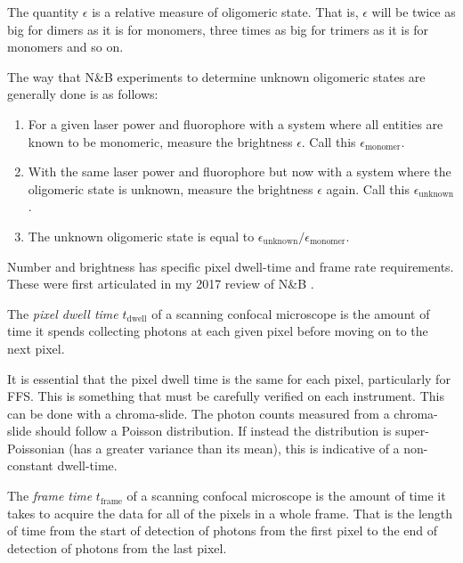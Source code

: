 \documentclass[12pt,]{book}
\providecommand{\tightlist}{%
  \setlength{\itemsep}{0pt}\setlength{\parskip}{0pt}}
\theoremstyle{definition}
\theoremstyle{definition}
\theoremstyle{definition}
\theoremstyle{remark}
\let\BeginKnitrBlock\begin \let\EndKnitrBlock\end
\begin{document}
The quantity \(\epsilon\) is a relative measure of oligomeric state.
That is, \(\epsilon\) will be twice as big for dimers as it is for
monomers, three times as big for trimers as it is for monomers and so
on.

The way that N\&B experiments to determine unknown oligomeric states are
generally done is as follows:

\begin{enumerate}
\def\labelenumi{\arabic{enumi}.}
\tightlist
\item
  For a given laser power and fluorophore with a system where all
  entities are known to be monomeric, measure the brightness
  \(\epsilon\). Call this \(\epsilon_\text{monomer}\).
\item
  With the same laser power and fluorophore but now with a system where
  the oligomeric state is unknown, measure the brightness \(\epsilon\)
  again. Call this \(\epsilon_\text{unknown}\).
\item
  The unknown oligomeric state is equal to
  \(\epsilon_\text{unknown} / \epsilon_\text{monomer}\).
\end{enumerate}

Number and brightness has specific pixel dwell-time and frame rate
requirements. These were first articulated in my 2017 review of N\&B
\citep{NBreview}.

\BeginKnitrBlock{definition}
\protect\hypertarget{def:unnamed-chunk-15}{}{\label{def:unnamed-chunk-15}
}The \emph{pixel dwell time} \(t_\text{dwell}\) of a scanning confocal
microscope is the amount of time it spends collecting photons at each
given pixel before moving on to the next pixel.
\EndKnitrBlock{definition}

It is essential that the pixel dwell time is the same for each pixel,
particularly for FFS. This is something that must be carefully verified
on each instrument. This can be done with a chroma-slide. The photon
counts measured from a chroma-slide should follow a Poisson
distribution. If instead the distribution is super-Poissonian (has a
greater variance than its mean), this is indicative of a non-constant
dwell-time.

\BeginKnitrBlock{definition}
\protect\hypertarget{def:unnamed-chunk-16}{}{\label{def:unnamed-chunk-16}
}The \emph{frame time} \(t_\text{frame}\) of a scanning confocal
microscope is the amount of time it takes to acquire the data for all of
the pixels in a whole frame. That is the length of time from the start
of detection of photons from the first pixel to the end of detection of
photons from the last pixel.
\EndKnitrBlock{definition}
\end{document}
